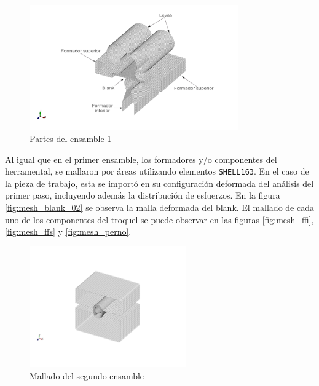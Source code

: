 

\begin{figure}[!h]
\centering
\includegraphics[width=0.8\textwidth]{src/ch3/parts_01.pdf}
\caption{Partes del ensamble 1}
\label{fig:parts_01}
\end{figure}




Al igual que en el primer ensamble, los formadores y/o componentes del herramental, se 
mallaron por áreas utilizando elementos \texttt{SHELL163}. En el caso de la pieza de trabajo, 
esta se importó en su configuración deformada del análisis del primer paso, incluyendo 
además la distribución de esfuerzos. En la figura \ref{fig:mesh_blank_02} se observa 
la malla deformada del blank. El mallado de cada uno de los componentes del troquel 
se puede observar en las figuras \ref{fig:mesh_ffi}, \ref{fig:mesh_ffs} y \ref{fig:mesh_perno}.


\begin{figure}[!h]
\centering
\includegraphics[width=0.6\textwidth]{src/ch3/parts_02.png}
\caption{Mallado del segundo ensamble}
\label{fig:parts_02}
\end{figure}

